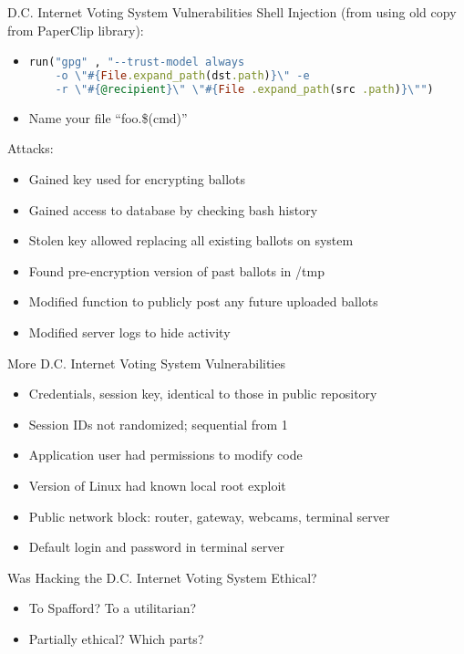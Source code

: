 \documentclass{beamer}
\begin{document}
\begin{frame}[fragile]{D.C. Internet Voting System Vulnerabilities}
Shell Injection (from using old copy from PaperClip library):
\begin{itemize}
\item[]
\begin{lstlisting}[language=Ruby]
run("gpg" , "--trust-model always
    -o \"#{File.expand_path(dst.path)}\" -e
    -r \"#{@recipient}\" \"#{File .expand_path(src .path)}\"")
\end{lstlisting}
\pause
\item[] Name your file ``foo.\$(cmd)''
\end{itemize}
\bigskip
\pause
Attacks:
\begin{itemize}
\item Gained key used for encrypting ballots
\item Gained access to database by checking bash history
\item Stolen key allowed replacing all existing ballots on system
\item Found pre-encryption version of past ballots in /tmp
\item Modified function to publicly post any future uploaded ballots
\item Modified server logs to hide activity
\end{itemize}
\end{frame}

\begin{frame}{More D.C. Internet Voting System Vulnerabilities}
\begin{itemize}
\item Credentials, session key, identical to those in public repository
\item Session IDs not randomized; sequential from 1
\item Application user had permissions to modify code
\item Version of Linux had known local root exploit
\item Public network block: router, gateway, webcams, terminal server
\item Default login and password in terminal server
\end{itemize}
\end{frame}

\begin{frame}{Was Hacking the D.C. Internet Voting System Ethical?}
\begin{itemize}
\item To Spafford? To a utilitarian?
\bigskip
\item Partially ethical? Which parts?
\end{itemize}

\end{frame}
\end{document}
